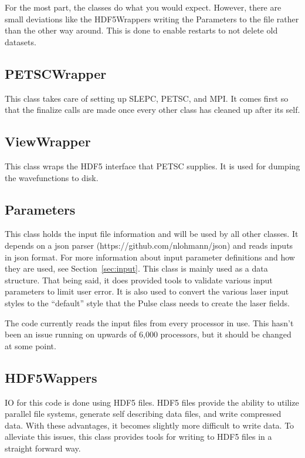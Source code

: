 \documentclass{article}
\begin{document}
For the most part, the classes do what you would expect. However, there are small deviations like the HDF5Wrappers writing the Parameters to the file rather than the other way around. This is done to enable restarts to not delete old datasets.

\subsection{PETSCWrapper} %
\label{sub:petscwrapper}
This class takes care of setting up SLEPC, PETSC, and MPI. It comes first so that the finalize calls are made once every other class has cleaned up after its self.

\subsection{ViewWrapper} %
\label{sub:viewwrapper}
This class wraps the HDF5 interface that PETSC supplies. It is used for dumping the wavefunctions to disk.

\subsection{Parameters} %
\label{sub:parameters}
This class holds the input file information and will be used by all other classes. It depends on a json parser (https://github.com/nlohmann/json) and reads inputs in json format. For more information about input parameter definitions and how they are used, see Section~\ref{sec:input}. This class is mainly used as a data structure. That being said, it does provided tools to validate various input parameters to limit user error. It is also used to convert the various laser input styles to the ``default'' style that the Pulse class needs to create the laser fields.

The code currently reads the input files from every processor in use. This hasn't been an issue running on upwards of 6,000 processors, but it should be changed at some point.


\subsection{HDF5Wappers} %
\label{sub:hdf5wappers}
IO for this code is done using HDF5 files. HDF5 files provide the ability to utilize parallel file systems, generate self describing data files, and write compressed data. With these advantages, it becomes slightly more difficult to write data. To alleviate this issues, this class provides tools for writing to HDF5 files in a straight forward way.
\end{document}
